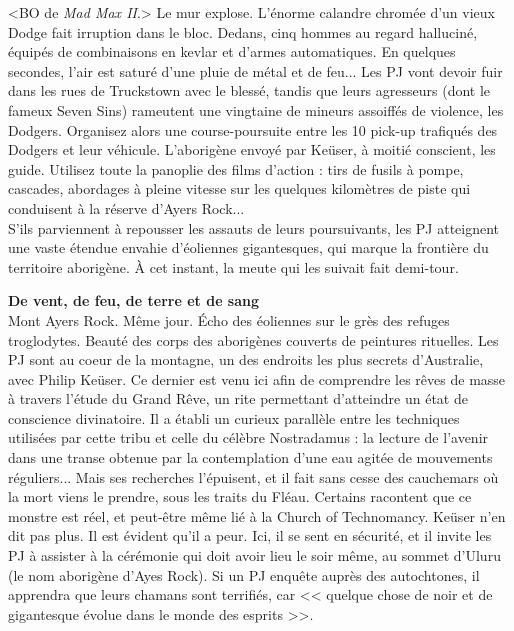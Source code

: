 \documentclass[11pt,twoside,a4paper]{book}
\begin{document}
<BO de \emph{Mad Max II}.> Le mur explose. L'{\'e}norme calandre chrom{\'e}e d'un vieux Dodge fait irruption dans le bloc. Dedans, cinq hommes au regard hallucin{\'e}, {\'e}quip{\'e}s de combinaisons en kevlar et d'armes automatiques. En quelques secondes, l'air est satur{\'e} d'une pluie de m{\'e}tal et de feu... Les PJ vont devoir fuir dans les rues de Truckstown avec le bless{\'e}, tandis que leurs agresseurs (dont le fameux Seven Sins) rameutent une vingtaine de mineurs assoiff{\'e}s de violence, les Dodgers. Organisez alors une course-poursuite entre les 10 pick-up trafiqu{\'e}s des Dodgers et leur v{\'e}hicule. L'aborig{\`e}ne envoy{\'e} par Ke{\"u}ser, {\`a} moiti{\'e} conscient, les guide. Utilisez toute la panoplie des films d'action : tirs de fusils {\`a} pompe, cascades, abordages {\`a} pleine vitesse sur les quelques kilom{\`e}tres de piste qui conduisent {\`a} la r{\'e}serve d'Ayers Rock...~\\

S'ils parviennent {\`a} repousser les assauts de leurs poursuivants, les PJ atteignent une vaste {\'e}tendue envahie d'{\'e}oliennes gigantesques, qui marque la fronti{\`e}re du territoire aborig{\`e}ne. {\`A} cet instant, la meute qui les suivait fait demi-tour.

\textbf{\large De vent, de feu, de terre et de sang}~\\

Mont Ayers Rock. M{\^e}me jour. {\'E}cho des {\'e}oliennes sur le gr{\`e}s des refuges troglodytes. Beaut{\'e} des corps des aborig{\`e}nes couverts de peintures rituelles. Les PJ sont au coeur de la montagne, un des endroits les plus secrets d'Australie, avec Philip Ke{\"u}ser. Ce dernier est venu ici afin de comprendre les r{\^e}ves de masse {\`a} travers l'{\'e}tude du Grand R{\^e}ve, un rite permettant d'atteindre un {\'e}tat de conscience divinatoire. Il a {\'e}tabli un curieux parall{\`e}le entre les techniques utilis{\'e}es par cette tribu et celle du c{\'e}l{\`e}bre Nostradamus : la lecture de l'avenir dans une transe obtenue par la contemplation d'une eau agit{\'e}e de mouvements r{\'e}guliers... Mais ses recherches l'{\'e}puisent, et il fait sans cesse des cauchemars o{\`u} la mort viens le prendre, sous les traits du Fl{\'e}au. Certains racontent que ce monstre est r{\'e}el, et peut-{\^e}tre m{\^e}me li{\'e} {\`a} la Church of Technomancy. Ke{\"u}ser n'en dit pas plus. Il est {\'e}vident qu'il a peur. Ici, il se sent en s{\'e}curit{\'e}, et il invite les PJ {\`a} assister {\`a} la c{\'e}r{\'e}monie qui doit avoir lieu le soir m{\^e}me, au sommet d'Uluru (le nom aborig{\`e}ne d'Ayes Rock). Si un PJ enqu{\^e}te aupr{\`e}s des autochtones, il apprendra que leurs chamans sont terrifi{\'e}s, car << quelque chose de noir et de gigantesque {\'e}volue dans le monde des esprits >>.~\\
\end{document}
